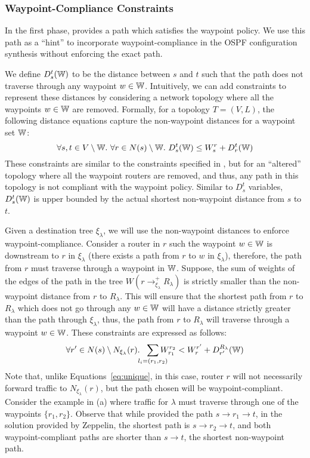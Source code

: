 \subsubsection{Waypoint-Compliance Constraints}
In the first phase, \genesis provides a path which
satisfies the waypoint policy. We use this path as a 
``hint'' to incorporate waypoint-compliance in the OSPF 
configuration synthesis without 
enforcing the exact path.

We define $D_s^t(\mathbb{W})$ to be the 
distance between $s$ and $t$ such that the path does not
 traverse through any waypoint $w \in \mathbb{W}$. Intuitively, we
  can add constraints to represent these distances by
  considering a network topology where all the  
  waypoints $w \in \mathbb{W}$ are removed. Formally, for a topology 
 $T = (V,L)$, the following distance equations 
 capture the non-waypoint distances 
 for a waypoint set $\mathbb{W}$:
\begin{equation} \label{eq:wdistance}
\forall s, t \in V \setminus \mathbb{W}. ~\forall r \in N(s) \setminus \mathbb{W}.~
D_s^t(\mathbb{W}) \leq W_s^r + D_r^t(\mathbb{W})
\end{equation}
These constraints are similar to the constraints specified in
, but for an ``altered'' topology where all
the waypoint routers are removed, and thus, any path in this 
topology is not compliant with the waypoint policy. 
Similar to $D_s^t$ variables, 
$D_s^t(\mathbb{W})$ is upper bounded by the actual shortest non-waypoint distance from $s$ to $t$.


Given a destination tree $\xi_\lambda$, we will use the 
non-waypoint distances to enforce waypoint-compliance. Consider a 
router in $r$ such the waypoint $w \in \mathbb{W}$ is downstream to $r$ in $\xi_\lambda$
(there exists a path from $r$ to $w$ in $\xi_\lambda$), therefore,
the path from $r$ must traverse through 
a waypoint in $\mathbb{W}$.  
Suppose, the sum of weights of the edges of
the path in the tree $W(r \rightarrow^+_{\xi_\lambda} R_\lambda)$  
is strictly smaller than the non-waypoint 
distance from $r$ to $R_\lambda$. This will ensure that 
the shortest path from $r$ to $R_\lambda$ which does not go through
any $w \in \mathbb{W}$ will have a distance strictly greater than the path through
$\xi_\lambda$, thus, the path from $r$ to $R_\lambda$ will traverse
through a waypoint $w \in \mathbb{W}$. These constraints are expressed as follows:
\begin{equation} \label{eq:waypoint}
\forall r' \in N(s) \setminus N_{\xi_\lambda}(r).~~ \sum_{\mathclap{\substack{l_i=(r_1,r_2)}}} 
W_{r_1}^{r_2} < 
W_{r}^{r'}+ D_{r'}^{R_\lambda}(\waypt) 
\end{equation}
Note that, unlike Equations~\ref{eq:unique}, in this case, 
router $r$ will not necessarily forward traffic to  
$N_{\xi_\lambda}(r)$, but the path chosen will be waypoint-compliant. 
Consider the example in (a) where traffic for
$\lambda$ must traverse through one of the waypoints $\{r_1, r_2\}$. 
Observe that while \genesis provided the path $s \rightarrow 
r_1 \rightarrow t$, in the solution provided by Zeppelin, 
the shortest path is $s \rightarrow r_2
\rightarrow t$, and both waypoint-compliant paths are shorter 
than $s \rightarrow t$, the shortest non-waypoint path.

